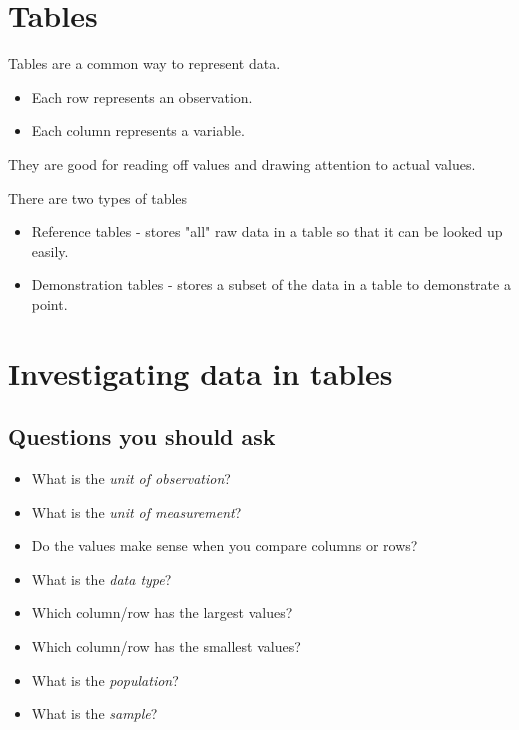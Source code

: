 \section{Tables}
\begin{definition}[Tables]
    Tables are a common way to represent data.
    \begin{itemize}
        \item Each row represents an observation.
        \item Each column represents a variable.
    \end{itemize}

    They are good for reading off values and drawing attention to actual values.

    There are two types of tables
    \begin{itemize}
        \item Reference tables - stores "all" raw data in a table so that it can be looked up easily.
        \item Demonstration tables - stores a subset of the data in a table to demonstrate a point.
    \end{itemize}
\end{definition}

\section{Investigating data in tables}

\subsection{Questions you should ask}
\begin{itemize}
    \item What is the \emph{unit of observation}?
    \item What is the \emph{unit of measurement}?
    \item Do the values make sense when you compare columns or rows?
    \item What is the \emph{data type}?
    \item Which column/row has the largest values?
    \item Which column/row has the smallest values?
    \item What is the \emph{population}?
    \item What is the \emph{sample}?
\end{itemize}



